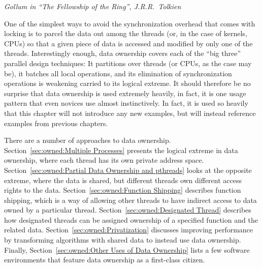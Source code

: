 
%
	 {\emph{Gollum in ``The Fellowship of the Ring'', J.R.R.~Tolkien}}

One of the simplest ways to avoid the synchronization overhead that
comes with locking is to parcel the data out among the threads (or,
in the case of kernels, CPUs)
so that a given piece of data is accessed and modified by only one
of the threads.
Interestingly enough, data ownership covers each of the ``big three''
parallel design techniques:
It partitions over threads (or CPUs, as the case may be),
it batches all local operations,
and its elimination of synchronization operations is weakening
carried to its logical extreme.
It should therefore be no surprise that data ownership is used extremely
heavily, in fact, it is one usage pattern that even novices use almost
instinctively.
In fact, it is used so heavily that this chapter will not introduce
any new examples, but will instead reference examples from previous
chapters.

\QuickQuizEnd

There are a number of approaches to data ownership.
Section~\ref{sec:owned:Multiple Processes} presents the logical extreme
in data ownership, where each thread has its own private address space.
Section~\ref{sec:owned:Partial Data Ownership and pthreads} looks at
the opposite extreme, where the data is shared, but different threads
own different access rights to the data.
Section~\ref{sec:owned:Function Shipping} describes function shipping,
which is a way of allowing other threads to have indirect access to
data owned by a particular thread.
Section~\ref{sec:owned:Designated Thread} describes how designated
threads can be assigned ownership of a specified function and the
related data.
Section~\ref{sec:owned:Privatization} discusses improving performance
by transforming algorithms with shared data to instead use data ownership.
Finally, Section~\ref{sec:owned:Other Uses of Data Ownership} lists
a few software environments that feature data ownership as a
first-class citizen.

